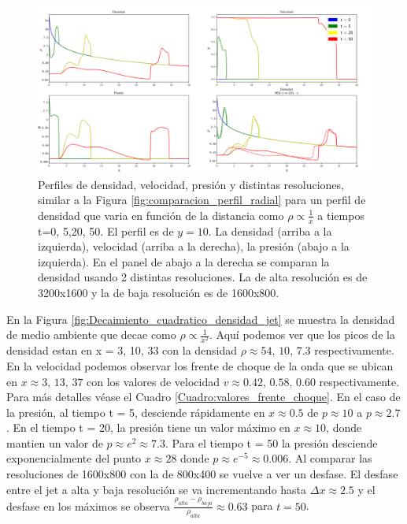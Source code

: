 \documentclass[12pt,a4paper]{book}
\begin{document}
\begin{figure}
  \centering
  \includegraphics[width = 1.0\textwidth]{./Figuras/jet/perfiles/perfiles_lineales.png}
  \caption{Perfiles de densidad, velocidad, presión y distintas resoluciones, similar a la Figura 
  \ref{fig:comparacion_perfil_radial} para un perfil de densidad que varia en función de la distancia como
  $\rho \varpropto \frac{1}{x}$ a tiempos t=0, 5,20, 50.
  El perfil es de $y = 10$.
  La densidad (arriba a la izquierda), velocidad (arriba a la derecha), la presión (abajo a la izquierda). 
  En el panel de abajo a la derecha se comparan la densidad usando 2 distintas resoluciones. La de alta resolución
  es de 3200x1600 y la de baja resolución es de 1600x800.}\label{fig:Decaimiento_lineal_densidad_jet}
\end{figure}


En la Figura \ref{fig:Decaimiento_cuadratico_densidad_jet} se muestra la densidad de medio ambiente 
que decae como $\rho \varpropto \frac{1}{x^2}$. Aquí podemos ver que los  picos de la densidad estan en
x = 3, 10, 33 con  la densidad $\rho \approx 54, \,  10, \,  7.3$ 
respectivamente. En la velocidad podemos observar
los frente de choque de la onda que se ubican en $x \approx 3, \, 13, \, 37$ con los valores de velocidad
$v \approx 0.42, \, 0.58, \, 0.60$ respectivamente. Para más detalles véase el Cuadro \ref{Cuadro:valores_frente_choque}.
En el caso de la presión, al tiempo t = 5, desciende rápidamente en $x \approx 0.5$ de 
$p  \approx 10$ a $p  \approx 2.7$.
En el tiempo t = 20, la presión tiene un valor máximo en $x \approx 10$, 
donde mantien un valor  de 
$p \approx e^2 \approx 7.3$. Para el tiempo t = 50
la presión desciende exponencialmente del punto $x \approx 28$ donde $p \approx e^{-5} \approx 0.006$.
Al comparar las resoluciones de 1600x800 con la de 800x400 se vuelve a ver un desfase. El desfase entre el jet a alta y 
baja resolución se va incrementando hasta $\Delta x \approx 2.5$ y {\color{red} el desfase en los 
máximos se observa  $\frac{\rho_{alta} - \rho_{baja}}{\rho_{alta}} \approx 0.63$} para $t = 50$.
\end{document}
